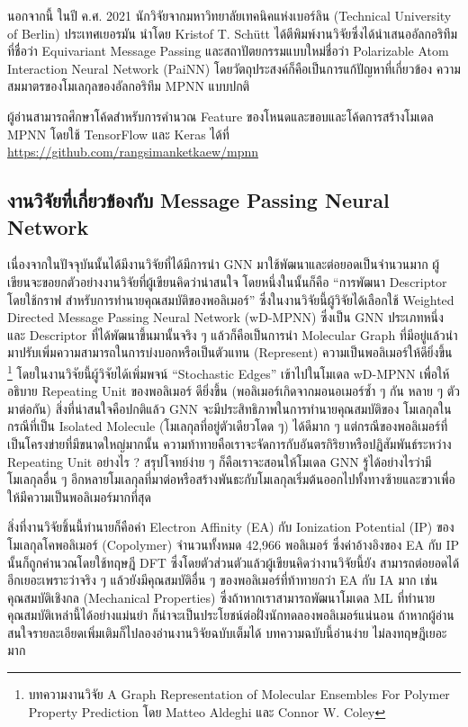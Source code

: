 นอกจากนี้ ในปี ค.ศ. 2021 นักวิจัยจากมหาวิทยาลัยเทคนิคแห่งเบอร์ลิน (Technical University of Berlin) ประเทศเยอรมัน นำโดย 
Kristof T. Sch\"{u}tt ได้ตีพิมพ์งานวิจัยซึ่งได้นำเสนออัลกอริทึมที่ชื่อว่า Equivariant Message Passing และสถาปัตยกรรมแบบใหม่ชื่อว่า 
Polarizable Atom Interaction Neural Network (PaiNN)\autocite{schutt2021} โดยวัตถุประสงค์ก็คือเป็นการแก้ปัญหาที่เกี่ยวข้อง%
ความสมมาตรของโมเลกุลของอัลกอริทึม MPNN แบบปกติ

ผู้อ่านสามารถศึกษาโค้ดสำหรับการคำนวณ Feature ของโหนดและขอบและโค้ดการสร้างโมเดล MPNN โดยใช้ TensorFlow และ Keras ได้ที่
\url{https://github.com/rangsimanketkaew/mpnn}

\subsection{งานวิจัยที่เกี่ยวข้องกับ Message Passing Neural Network}
\label{ssec:mpnn_papers}

เนื่องจากในปัจจุบันนั้นได้มีงานวิจัยที่ได้มีการนำ GNN มาใช้พัฒนาและต่อยอดเป็นจำนวนมาก ผู้เขียนจะขอยกตัวอย่างงานวิจัยที่ผู้เขียนคิดว่าน่าสนใจ 
โดยหนึ่งในนั้นก็คือ \enquote{การพัฒนา Descriptor โดยใช้กราฟ สำหรับการทำนายคุณสมบัติของพอลิเมอร์}\autocite{aldeghi2022} 
ซึ่งในงานวิจัยนี้ผู้วิจัยได้เลือกใช้ Weighted Directed Message Passing Neural Network (wD-MPNN) ซึ่งเป็น GNN ประเภทหนึ่ง และ 
Descriptor ที่ได้พัฒนาขึ้นมานั้นจริง ๆ แล้วก็คือเป็นการนำ Molecular Graph ที่มีอยู่แล้วนำมาปรับเพิ่มความสามารถในการบ่งบอกหรือเป็นตัวแทน 
(Represent) ความเป็นพอลิเมอร์ให้ดียิ่งขึ้น%
\footnote{บทความงานวิจัย A Graph Representation of Molecular Ensembles For Polymer Property Prediction โดย 
Matteo Aldeghi และ Connor W. Coley} 
โดยในงานวิจัยนี้ผู้วิจัยได้เพิ่มพจน์ \enquote{Stochastic Edges} เข้าไปในโมเดล wD-MPNN เพื่อให้อธิบาย Repeating Unit ของพอลิเมอร์%
ดียิ่งขึ้น (พอลิเมอร์เกิดจากมอนอเมอร์ซ้ำ ๆ กัน หลาย ๆ ตัวมาต่อกัน) สิ่งที่น่าสนใจคือปกติแล้ว GNN จะมีประสิทธิภาพในการทำนายคุณสมบัติของ%
โมเลกุลในกรณีที่เป็น Isolated Molecule (โมเลกุลที่อยู่ตัวเดียวโดด ๆ) ได้ดีมาก ๆ แต่กรณีของพอลิเมอร์ที่เป็นโครงข่ายที่มีขนาดใหญ่มากนั้น 
ความท้าทายคือเราจะจัดการกับอันตรกิริยาหรือปฏิสัมพันธ์ระหว่าง Repeating Unit อย่างไร ? สรุปโจทย์ง่าย ๆ ก็คือเราจะสอนให้โมเดล GNN 
รู้ได้อย่างไรว่ามีโมเลกุลอื่น ๆ อีกหลายโมเลกุลที่มาต่อหรือสร้างพันธะกับโมเลกุลเริ่มต้นออกไปทั้งทางซ้ายและขวาเพื่อให้มีความเป็นพอลิเมอร์มากที่สุด 

สิ่งที่งานวิจัยชิ้นนี้ทำนายก็คือค่า Electron Affinity (EA) กับ Ionization Potential (IP) ของโมเลกุลโคพอลิเมอร์ (Copolymer) 
จำนวนทั้งหมด 42,966 พอลิเมอร์ ซึ่งค่าอ้างอิงของ EA กับ IP นั้นก็ถูกคำนวณโดยใช้ทฤษฎี DFT ซึ่งโดยตัวส่วนตัวแล้วผู้เขียนคิดว่างานวิจัยนี้ยัง%
สามารถต่อยอดได้อีกเยอะเพราะว่าจริง ๆ แล้วยังมีคุณสมบัติอื่น ๆ ของพอลิเมอร์ที่ท้าทายกว่า EA กับ IA มาก เช่น คุณสมบัติเชิงกล (Mechanical 
Properties) ซึ่งถ้าหากเราสามารถพัฒนาโมเดล ML ที่ทำนายคุณสมบัติเหล่านี้ได้อย่างแม่นยำ ก็น่าจะเป็นประโยชน์ต่อฝั่งนักทดลองพอลิเมอร์แน่นอน
ถ้าหากผู้อ่านสนใจรายละเอียดเพิ่มเติมก็ไปลองอ่านงานวิจัยฉบับเต็มได้ บทความฉบับนี้อ่านง่าย ไม่ลงทฤษฎีเยอะมาก

